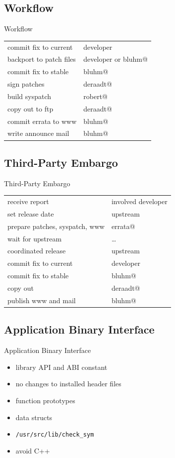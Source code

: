 \documentclass[14pt,aspectratio=169]{beamer}
\begin{document}
\subsection{Workflow}
\begin{frame}{Workflow}
\centering
\renewcommand{\arraystretch}{1.2}
\begin{tabular}{ll}
commit fix to current		& developer			\\
backport to patch files		& developer or bluhm@		\\
commit fix to stable		& bluhm@			\\
sign patches			& deraadt@			\\
build syspatch			& robert@			\\
copy out to ftp			& deraadt@			\\
commit errata to www		& bluhm@			\\
write announce mail		& bluhm@			\\
\end{tabular}
\end{frame}

\subsection{Third-Party Embargo}
\begin{frame}{Third-Party Embargo}
\centering
\renewcommand{\arraystretch}{1.2}
\begin{tabular}{ll}
receive report			& involved developer		\\
set release date		& upstream			\\
prepare patches, syspatch, www	& errata@			\\
wait for upstream		& \dots				\\
coordinated release		& upstream			\\
commit fix to current		& developer			\\
commit fix to stable		& bluhm@			\\
copy out			& deraadt@			\\
publish www and mail		& bluhm@			\\
\end{tabular}
\end{frame}

\subsection{Application Binary Interface}
\begin{frame}{Application Binary Interface}
\begin{itemize}
\item library API and ABI constant
\item no changes to installed header files
\item function prototypes
\item data structs
\item \texttt{/usr/src/lib/check\_sym}
\item avoid C++
\end{itemize}
\end{frame}
\end{document}
